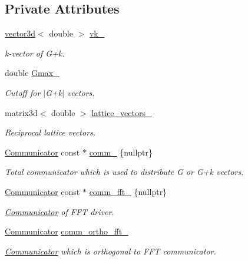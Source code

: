\subsection*{Private Attributes}
\begin{DoxyCompactItemize}
\item 
\hyperlink{classgeometry3d_1_1vector3d}{vector3d}$<$ double $>$ \hyperlink{classsddk_1_1_gvec_a551efdd55a49e52f00682180671a8560}{vk\+\_\+}
\begin{DoxyCompactList}\small\item\em k-\/vector of G+k. \end{DoxyCompactList}\item 
double \hyperlink{classsddk_1_1_gvec_ac13f6091f0f60497c438add42b5e52e0}{Gmax\+\_\+}
\begin{DoxyCompactList}\small\item\em Cutoff for $\vert$\+G+k$\vert$ vectors. \end{DoxyCompactList}\item 
matrix3d$<$ double $>$ \hyperlink{classsddk_1_1_gvec_ad07aec291ebc9cd3012add1cf5ebcd21}{lattice\+\_\+vectors\+\_\+}
\begin{DoxyCompactList}\small\item\em Reciprocal lattice vectors. \end{DoxyCompactList}\item 
\hyperlink{classsddk_1_1_communicator}{Communicator} const $\ast$ \hyperlink{classsddk_1_1_gvec_af8b6dd15077c6c925d16d57fbd5a54a1}{comm\+\_\+} \{nullptr\}
\begin{DoxyCompactList}\small\item\em Total communicator which is used to distribute G or G+k vectors. \end{DoxyCompactList}\item 
\hyperlink{classsddk_1_1_communicator}{Communicator} const $\ast$ \hyperlink{classsddk_1_1_gvec_a14f019949de6fd1fa0f1b6c688984787}{comm\+\_\+fft\+\_\+} \{nullptr\}
\begin{DoxyCompactList}\small\item\em \hyperlink{classsddk_1_1_communicator}{Communicator} of F\+F\+T driver. \end{DoxyCompactList}\item 
\hyperlink{classsddk_1_1_communicator}{Communicator} \hyperlink{classsddk_1_1_gvec_aa8bf9350f829ce50c9b6036fff8a5609}{comm\+\_\+ortho\+\_\+fft\+\_\+}
\begin{DoxyCompactList}\small\item\em \hyperlink{classsddk_1_1_communicator}{Communicator} which is orthogonal to F\+F\+T communicator. \end{DoxyCompactList}\item 

\end{DoxyCompactItemize}
